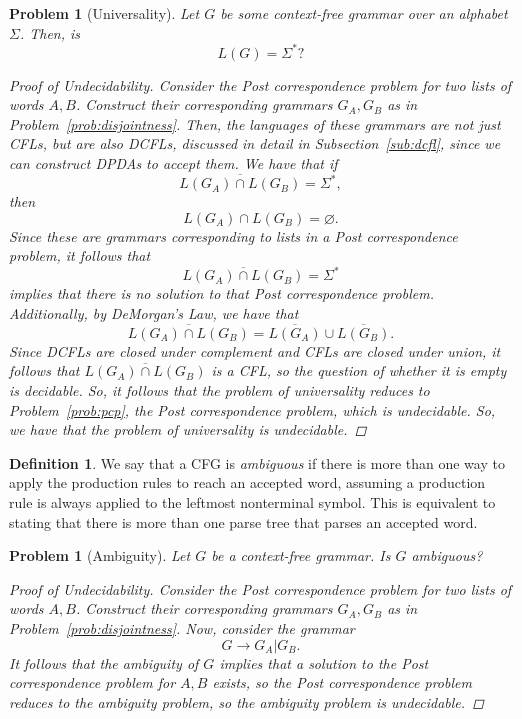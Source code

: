 \documentclass[psamsfonts]{amsart}
\newtheorem{prob}[thm]{Problem}
\theoremstyle{definition}
\newtheorem{defn}[thm]{Definition}
\theoremstyle{remark}
\numberwithin{equation}{section}
\begin{document}
\begin{prob}[Universality]
  \label{prob:cfg:universality}
  Let $G$ be some context-free grammar over an alphabet $\Sigma$. Then, is
  \[
    L(G) = \Sigma^*?
  \]
  \begin{proof}[Proof of Undecidability]
    Consider the Post correspondence problem for two lists of words
    $A,B$. Construct their corresponding grammars $G_A,G_B$ as in Problem~\ref{prob:disjointness}. Then, the languages
    of these grammars are not just \acp{CFL}, but are also \aclp{DCFL},
    discussed in detail in Subsection~\ref{sub:dcfl}, since we
    can construct \aclp{DPDA} to accept them. We have that if
    \[\overline{L(G_A)\cap L(G_B)} = \Sigma^*,\] then
    \[L(G_A)\cap L(G_B)=\varnothing.\] Since these are grammars corresponding to
    lists in a Post correspondence problem, it follows
    that \[\overline{L(G_A)\cap L(G_B)} = \Sigma^*\] implies that there is no
    solution to that Post correspondence problem. Additionally, by DeMorgan's Law, we have
    that
    \[
      \overline{L(G_A)\cap L(G_B)} =
      \overline{L(G_A)}\cup\overline{L(G_B)}.
    \]
    Since \acp{DCFL} are closed under complement and \acp{CFL} are closed under
    union, it follows that $ \overline{L(G_A)\cap L(G_B)}$ is a \ac{CFL}, so the
    question of whether it is empty is decidable. So, it follows that the
    problem of universality reduces to Problem~\ref{prob:pcp}, the Post
    correspondence problem, which is undecidable. So, we have that the
    problem of universality is undecidable.
  \end{proof}
\end{prob}

\begin{defn}
We say that a \acl{CFG} is \emph{ambiguous} if there is more than one way to
apply the production rules to reach an accepted word, assuming a production rule
is always applied to the leftmost nonterminal symbol. This is equivalent to
stating that there is more than one parse tree that parses an accepted word.
\end{defn}

\begin{prob}[Ambiguity]
  Let $G$ be a context-free grammar. Is $G$ ambiguous?
  \begin{proof}[Proof of Undecidability]
    Consider the Post correspondence problem for two lists of words
    $A,B$. Construct their corresponding grammars $G_A,G_B$ as in Problem~\ref{prob:disjointness}. Now, consider the
    grammar
    \[
      G \rightarrow G_A \vert G_B.
    \]
    It follows that the ambiguity of $G$ implies that a solution to the Post
    correspondence problem for $A,B$ exists, so the Post correspondence problem
    reduces to the ambiguity problem, so the ambiguity problem is undecidable.
  \end{proof}
\end{prob}
\end{document}
